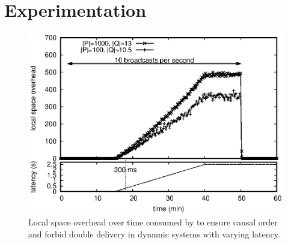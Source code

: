 
\section{Experimentation}
\label{sec:experimentation}

%   



\begin{figure}
  \begin{center}
    \includegraphics[width=0.8\columnwidth]{./img/overhead.eps}
    \caption{\label{fig:overhead}Local space overhead over time consumed by \RPCBROADCAST to ensure
      causal order and forbid double delivery in dynamic systems with varying latency.}
  \end{center}
\end{figure}


